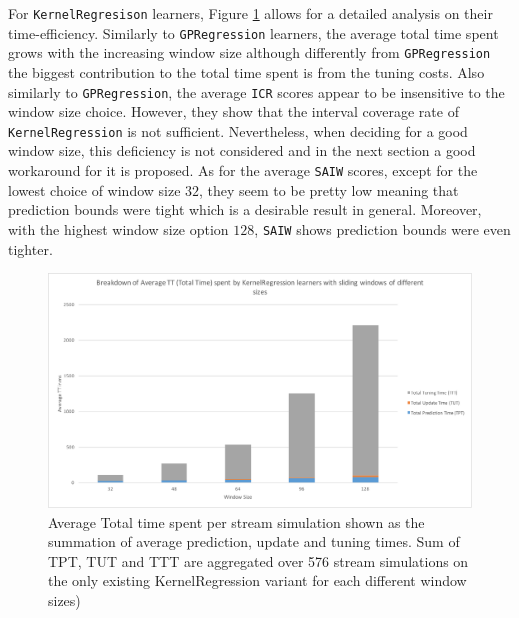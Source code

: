 For \texttt{KernelRegresison} learners, Figure \ref{fig:ws_on_kreg_tt} allows for a detailed analysis on their time-efficiency. Similarly to \texttt{GPRegression} learners, the average total time spent grows with the increasing window size although differently from \texttt{GPRegression} the biggest contribution to the total time spent is from the tuning costs. Also similarly to \texttt{GPRegression}, the average \texttt{ICR} scores appear to be insensitive to the window size choice. However, they show that the interval coverage rate of \texttt{KernelRegression} is not sufficient. Nevertheless, when deciding for a good window size, this deficiency is not considered and in the next section a good workaround for it is proposed. As for the average \texttt{SAIW} scores, except for the lowest choice of window size $32$, they seem to be pretty low meaning that prediction bounds were tight which is a desirable result in general. Moreover, with the highest window size option $128$, \texttt{SAIW} shows prediction bounds were even tighter.

\begin{figure}[htbp]
  \centering
    \includegraphics[width=\linewidth]{./Figures/ws_on_kreg_tt.pdf}
  \caption{Average Total time spent per stream simulation shown as the summation of average prediction, update and tuning times. Sum of TPT, TUT and TTT are aggregated over 576 stream simulations on the only existing KernelRegression variant for each different window sizes)}
  \label{fig:ws_on_kreg_tt}
\end{figure}

